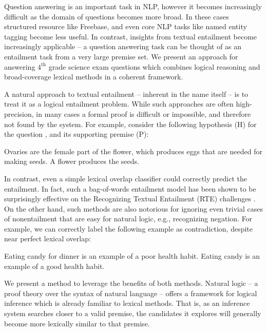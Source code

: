 Question answering is an important task in NLP, however it becomes
  increasingly difficult as the domain of questions becomes more broad.
In these cases structured resource like Freebase, and even core NLP tasks
  like named entity tagging become less useful.
In contrast, insights from textual entailment become increasingly applicable --
  a question answering task can be thought of as an entailment task from a
  very large premise set.
We present an approach for answering $4^\textrm{th}$ grade science exam questions
  which combines logical reasoning and broad-coverage lexical methods in a
  coherent framework.

A natural approach to textual entailment -- inherent in the name itself -- is to
  treat it as a logical entailment problem.
While such approaches are often high-precision, in many cases a formal proof
  is difficult or impossible, and therefore not found by the system.
For example, consider the following hypothesis (H) for the question
  , and its supporting premise (P):

\entailmentExample
{Ovaries are the female part of the flower, which produces eggs that are needed for making seeds.}
{A flower produces the seeds.}

In contrast, even a simple lexical overlap classifier could correctly predict
  the entailment.
In fact, such a bag-of-words entailment model has been shown to be surprisingly
  effective on the Recognizing Textual Entailment (RTE) challenges 
  \cite{key:2009maccartney-thesis}.
On the other hand, such methods are also notorious for ignoring even trivial 
  cases of nonentailment that are easy for natural logic, e.g., recognizing negation.
For example, we can correctly label the following example
  as contradiction, despite near perfect lexical overlap:

\entailmentExample
{Eating candy for dinner is an example of a poor health habit.}
{Eating candy is an example of a good health habit.}

We present a method to leverage the benefits of both methods.
Natural logic -- a proof theory over the syntax of natural language --
  offers a framework for logical inference which is already
  familiar to lexical methods.
That is, as an inference system searches closer to a valid premise,
  the candidates it explores will generally become more lexically similar
  to that premise.

